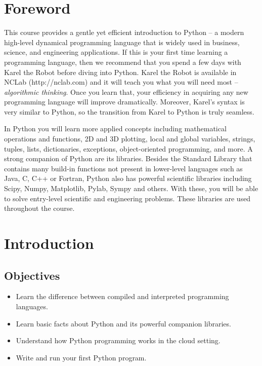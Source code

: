 \documentclass[article,A4,12pt]{llncs}
\begin{document}
\newpage

\pagestyle{plain}
\setcounter{page}{1}

\pagestyle{plain}
\setcounter{page}{1}
\section*{Foreword}
This course provides a gentle yet efficient introduction to Python -- 
a modern high-level dynamical programming language that is widely used in business, 
science, and engineering applications. If this is your first time learning 
a programming language, then we recommend that you spend a few days with 
Karel the Robot before diving into Python. Karel the Robot is available 
in NCLab (http://nclab.com) and it will teach you what you will need most --
{\em algorithmic 
thinking}. Once you learn that, your efficiency in acquiring any new programming language
will improve dramatically. Moreover, Karel's syntax is very similar to Python, 
so the transition from Karel to Python is truly seamless.

In Python you will learn more applied concepts including mathematical operations
and functions, 2D and 3D plotting, local and global variables, strings, tuples, lists, dictionaries, 
exceptions, object-oriented programming, and more. 
A strong companion of Python are its libraries. Besides the Standard Library that
contains many build-in functions not present in lower-level languages such as 
Java, C, C++ or Fortran, Python also has powerful scientific libraries including 
Scipy, Numpy, Matplotlib, Pylab, Sympy and others. With these, you will be able to 
solve entry-level scientific and engineering problems. These libraries are used
throughout the course.  

\setcounter{section}{0}
\section{Introduction}

\subsection{Objectives}

\begin{itemize}
\item Learn the difference between compiled and interpreted programming languages.
\item Learn basic facts about Python and its powerful companion libraries.
\item Understand how Python programming works in the cloud setting.
\item Write and run your first Python program.
\end{itemize}
\end{document}
